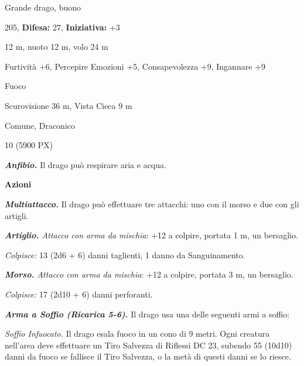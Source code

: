\begin{multicols}{2}
{
\noindent
\begin{description}[noitemsep, topsep=0pt, parsep=0pt, partopsep=0pt, leftmargin=0cm, labelwidth=2.2cm]
	\item[\textbf{Taglia/Tipo:}] Grande drago, buono
	\item[\textbf{Caratt.:}] 
	\item[\textbf{Punti Ferita:}] 205,  \textbf{Difesa:} 27,  \textbf{Iniziativa:} +3
	\item[\textbf{Movimento:}] 12 m, nuoto 12 m, volo 24 m
	\item[\textbf{Tiri Salvez.:}] 
	\item[\textbf{Comp.:}] Furtività +6, Percepire Emozioni +5, Consapevolezza +9, Ingannare +9
	\item[\textbf{Imm. Danni:}] Fuoco
	\item[\textbf{Sensi:}] Scurovisione 36 m, Vista Cieca 9 m
	\item[\textbf{Linguaggi:}] Comune, Draconico
	\item[\textbf{Sfida:}] 10 (5900 PX)\smallskip
\end{description}

\emph{\textbf{Anfibio.}} Il drago può respirare aria e acqua.

\textbf{Azioni}

\emph{\textbf{Multiattacco.}} Il drago può effettuare tre attacchi: uno con il morso e due con gli artigli.

\emph{\textbf{Artiglio.} Attacco con arma da mischia}: +12 a colpire, portata 1 m, un bersaglio.

\emph{Colpisce:} 13 (2d6 + 6) danni taglienti, 1 danno da Sanguinamento.

\emph{\textbf{Morso.} Attacco con arma da mischia}: +12 a colpire, portata 3 m, un bersaglio.

\emph{Colpisce:} 17 (2d10 + 6) danni perforanti.

\emph{\textbf{Arma a Soffio (Ricarica 5-6).}} Il drago usa una delle seguenti armi a soffio:

\emph{Soffio Infuocato.} Il drago esala fuoco in un cono di 9 metri. Ogni creatura nell'area deve effettuare un Tiro Salvezza di Riflessi DC 23, subendo 55 (10d10) danni da fuoco se fallisce il Tiro Salvezza, o la metà di questi danni se lo riesce.

}
\end{multicols}
